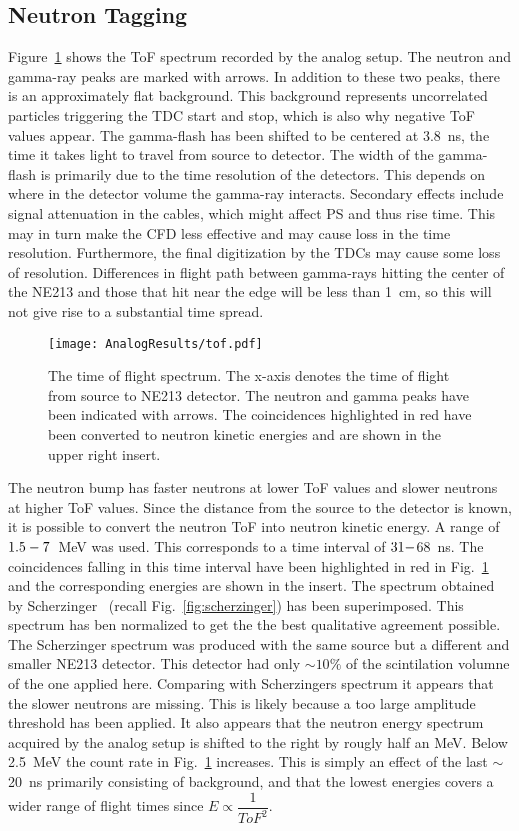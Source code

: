 \documentclass[main.tex]{subfiles}
\begin{document}
\subsection{Neutron Tagging}
Figure~\ref{fig:tof_a} shows the ToF spectrum recorded by the analog setup. The neutron and gamma-ray peaks are marked with arrows. In addition to these two peaks, there is an approximately flat background. This background represents uncorrelated particles triggering the TDC start and stop, which is also why negative ToF values appear.
The gamma-flash has been shifted to be centered at \SI{3.8}{ns}, the time it takes light to travel from source to detector. The width of the gamma-flash is primarily due to the time resolution of the detectors. This depends on where in the detector volume the gamma-ray interacts. Secondary effects include signal attenuation in the cables, which might affect PS and thus rise time. This may in turn make the CFD less effective and may cause loss in the time resolution. Furthermore, the final  digitization by the TDCs may cause some loss of resolution. Differences in flight path between gamma-rays hitting the center of the NE213 and those that hit near the edge will be less than \SI{1}{cm}, so this will not give rise to a substantial time spread. 
\begin{figure}[ht]
    \centering
        \texttt{[image: AnalogResults/tof.pdf]}
        \caption[Time of flight spectrum, analog setup.]{The time of flight spectrum. The x-axis denotes the time of flight from source to NE213 detector. The neutron and gamma peaks have been indicated with arrows. The coincidences highlighted in red have been converted to neutron kinetic energies and are shown in the upper right insert.}
    \label{fig:tof_a}
\end{figure}
The neutron bump has faster neutrons at lower ToF values and slower neutrons at higher ToF values. Since the distance from the source to the detector is known, it is possible to convert the neutron ToF into neutron kinetic energy. A range of $1.5\--7$~\si{\MeV} was used. This corresponds to a time interval of $31\--$\SI{68}{\ns}. The coincidences falling in this time interval have been highlighted in red in Fig.~\ref{fig:tof_a} and the corresponding energies are shown in the insert. The spectrum obtained by Scherzinger~\cite{ScherzingerPhd} (recall Fig.~\ref{fig:scherzinger}) has been superimposed. This spectrum has ben normalized to get the the best qualitative agreement possible. The Scherzinger spectrum was produced with the same source but a different and smaller NE213 detector. This detector had only $\sim10\%$ of the scintilation volumne of the one applied here. 
Comparing with Scherzingers spectrum it appears that the slower neutrons are missing. This is likely because a too large amplitude threshold has been applied. 
It also appears that the neutron energy spectrum acquired by the analog setup is shifted to the right by rougly half an MeV. Below \SI{2.5}{MeV} the count rate in Fig.~\ref{fig:tof_a} increases. This is simply an effect of the last $\sim$\SI{20}{\ns} primarily consisting of background, and that the lowest energies covers a wider range of flight times since $E\propto \dfrac{1}{ToF^2}$.
\end{document}
